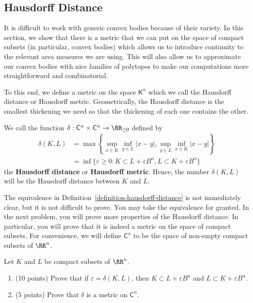 \documentclass[11pt]{article}
\begin{document}
\subsection{Hausdorff Distance}

It is difficult to work with generic convex bodies because of their variety. In this section, we show that there is a metric that we can put on the space of compact subsets (in particular, convex bodies) which allows us to introduce continuity to the relevant area measures we are using. This will also allow us to approximate our convex bodies with nice families of polytopes to make our computations more straightforward and combinatorial.

To this end, we define a metric on the space $\mathsf{K}^n$ which we call the Hausdorff distance or Hausdorff metric. Geometrically, the Hausdorff distance is the smallest thickening we need so that the thickening of each one contains the other. 

\begin{defn} \label{definition-hausdorff-distance}
    We call the function $\delta : \mathsf{C}^n \times \mathsf{C}^n \to \RR_{\geq 0}$ defined by
\begin{align*}
    \delta(K, L) & = \max \left \{ \sup_{x \in K} \inf_{y \in L} |x-y|, \sup_{y \in L} \inf_{x \in K} |x-y| \right \} \\
    & = \inf \{\varepsilon \geq 0 : K \subset L + \varepsilon B^n, L \subset K + \varepsilon B^n\} 
\end{align*}
    the \textbf{Hausdorff distance} or \textbf{Hausdorff metric}. Hence, the number $\delta(K, L)$ will be the Hausdorff distance between $K$ and $L$. 
\end{defn}

The equivalence in Definition~\ref{definition-hausdorff-distance} is not immediately clear, but it is not difficult to prove. You may take the equivalence for granted. In the next problem, you will prove more properties of the Hausdorff distance. In particular, you will prove that it is indeed a metric on the space of compact subsets. For convenience, we will define $\mathsf{C}^n$ to be the space of non-empty compact subsets of $\RR^n$. 

\begin{prob}[15 points]
    Let $K$ and $L$ be compact subsets of $\RR^n$. 
    \begin{enumerate}[label = (\alph*)]
        \item (10 points) Prove that if $\varepsilon = \delta(K, L)$, then $K \subset L + \varepsilon B^n$ and $L \subset K + \varepsilon B^n$.  

        \item (5 points) Prove that $\delta$ is a metric on $\mathsf{C}^n$. 
    \end{enumerate}
\end{prob}
\end{document}
